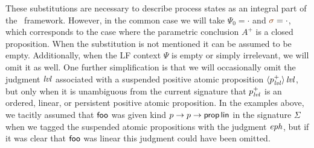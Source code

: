 These substitutions are necessary to describe process states as an
integral part of the \sls~framework. However, in the common case we
will take $\Psi_0 = \cdot$ and $\lf{\sigma} = \cdot$, which
corresponds to the case where the parametric conclusion $A^+$ is a
closed proposition. When the substitution is not mentioned it can be
assumed to be empty. Additionally, when the LF context $\Psi$ is empty
or simply irrelevant, we will omit it as well. One further
simplification is that we will occasionally omit the judgment ${\it lvl}$
associated with a suspended positive atomic proposition
${\langle {p^+_{\it lvl}} \rangle}\,{{\it lvl}}$, but only when it is unambiguous from the
current signature that $p^+_{\it lvl}$ is an ordered, linear, or
persistent positive atomic proposition. In the examples above, we
tacitly assumed that ${\sf foo}$ was given kind $p \rightarrow p
\rightarrow {\sf prop}\,{\sf lin}$ in the signature $\Sigma$ when we
tagged the suspended atomic propositions with the judgment ${\it eph}$, but if
it was clear that ${\sf foo}$ was linear this judgment
could have been omitted. 


